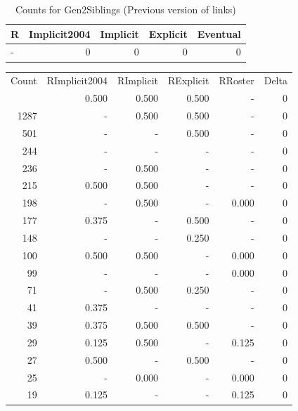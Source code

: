 \documentclass[a4paper]{article}\usepackage[]{graphicx}\usepackage[]{color}
\begin{document}
\begin{table}[ht]
\centering
{\large
\begin{tabular}{lrrrr}
  \hline
R & Implicit2004 & Implicit & Explicit & Eventual \\ 
  \hline
- &   0 &   0 &   0 &   0 \\ 
   \hline
\end{tabular}
}
\caption{Counts for Gen2Siblings (Previous version of links)} 
\end{table}



\begin{table}[ht]
\centering
\begin{tabular}{rrrrrr}
  \hline
Count & RImplicit2004 & RImplicit & RExplicit & RRoster & Delta \\ 
  \rowcolor{goodColor}  \hline
1477 & 0.500 & 0.500 & 0.500 & - & 0 \\ 
   \rowcolor{goodColor} 1287 & - & 0.500 & 0.500 & - & 0 \\ 
   \rowcolor{sosoColor} 501 & - & - & 0.500 & - & 0 \\ 
   \rowcolor{nullColor} 244 & - & - & - & - & 0 \\ 
  236 & - & 0.500 & - & - & 0 \\ 
  215 & 0.500 & 0.500 & - & - & 0 \\ 
  198 & - & 0.500 & - & 0.000 & 0 \\ 
   \rowcolor{sosoColor} 177 & 0.375 & - & 0.500 & - & 0 \\ 
   \rowcolor{sosoColor} 148 & - & - & 0.250 & - & 0 \\ 
  100 & 0.500 & 0.500 & - & 0.000 & 0 \\ 
   \rowcolor{nullColor} 99 & - & - & - & 0.000 & 0 \\ 
   \rowcolor{badColor} 71 & - & 0.500 & 0.250 & - & 0 \\ 
   \rowcolor{nullColor} 41 & 0.375 & - & - & - & 0 \\ 
   \rowcolor{goodColor} 39 & 0.375 & 0.500 & 0.500 & - & 0 \\ 
  29 & 0.125 & 0.500 & - & 0.125 & 0 \\ 
   \rowcolor{sosoColor} 27 & 0.500 & - & 0.500 & - & 0 \\ 
  25 & - & 0.000 & - & 0.000 & 0 \\ 
   \rowcolor{nullColor} 19 & 0.125 & - & - & 0.125 & 0 \\ 

\end{tabular}
\end{table}
\end{document}
